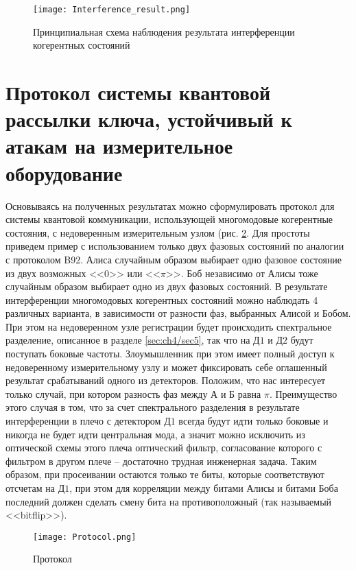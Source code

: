 \begin{figure}[ht]
 \centering
  \texttt{[image: Interference\_result.png]}
  \caption{Принципиальная схема наблюдения результата интерференции когерентных состояний}
  \label{fig:Interference_result}
\end{figure}

\pagebreak

\section{Протокол системы квантовой рассылки ключа, устойчивый к атакам на измерительное оборудование} \label{ch:ch4/sec6}

Основываясь на полученных результатах можно сформулировать протокол для системы квантовой коммуникации, использующей многомодовые когерентные состояния, с недоверенным измерительным узлом (рис. \ref{fig:Protocol}. Для простоты приведем пример с использованием только двух фазовых состояний по аналогии с протоколом B92. Алиса случайным образом выбирает одно фазовое состояние из двух возможных <<$0$>> или <<$\pi$>>. Боб независимо от Алисы тоже случайным образом выбирает одно из двух фазовых состояний. В результате интерференции многомодовых когерентных состояний можно наблюдать 4 различных варианта, в зависимости от разности фаз, выбранных Алисой и Бобом.  При этом на недоверенном узле регистрации будет происходить спектральное разделение, описанное в разделе \ref{sec:ch4/sec5}, так что на $Д1$ и $Д2$ будут поступать боковые частоты. Злоумышленник при этом имеет полный доступ к недоверенному измерительному узлу и может фиксировать себе оглашенный результат срабатываний одного из детекторов. Положим, что нас интересует только случай, при котором разность фаз между $А$ и $Б$ равна $\pi$. Преимущество этого случая в том, что за счет спектрального разделения в результате интерференции в плечо с детектором $Д1$ всегда будут идти только боковые и никогда не будет идти центральная мода, а значит можно исключить из оптической схемы этого плеча оптический фильтр, согласование которого с фильтром в другом плече -- достаточно трудная инженерная задача. Таким образом, при просеивании остаются только те биты, которые соответствуют отсчетам на $Д1$, при этом для корреляции между битами Алисы и битами Боба последний должен сделать смену бита на противоположный (так называемый <<bitflip>>).  

\begin{figure}[ht]
 \centering
  \texttt{[image: Protocol.png]}
  \caption{Протокол}
  \label{fig:Protocol}
\end{figure}


